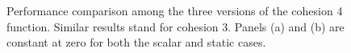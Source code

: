 \documentclass[12pt,	%
	a4paper,		%
	twoside,		%
	openright,		%
	titlepage,%
	]{book}
\theoremstyle{definition}
\begin{document}
\begin{figure}[!ht]
\begin{tabular}{cc}
\end{tabular}
\caption[Performance comparison of cohesions 3 and 4 implementations]{Performance comparison among the three versions of the cohesion 4 function. Similar results stand for cohesion 3. Panels (a) and (b) are constant at zero for both the scalar and static cases.}
\label{fig: cohesion3 comparison}
\end{figure}

\end{document}
